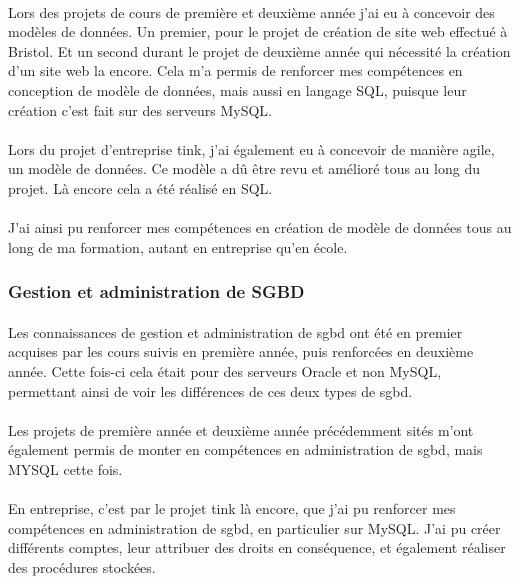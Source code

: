 \documentclass[12pt,a4paper]{report}
\begin{document}
\paragraph*{}Lors des projets de cours de première et deuxième année j'ai eu à concevoir des modèles de données. Un premier, pour le projet de création de site web effectué à Bristol. Et un second durant le projet de deuxième année qui nécessité la création d'un site web la encore. Cela m'a permis de renforcer mes compétences en conception de modèle de données, mais aussi en langage SQL, puisque leur création c'est fait sur des serveurs MySQL.
\paragraph*{}Lors du projet d'entreprise \gls{tink}, j'ai également eu à concevoir de manière agile, un modèle de données. Ce modèle a dû être revu et amélioré tous au long du projet. Là encore cela a été réalisé en SQL.
\paragraph*{}J'ai ainsi pu renforcer mes compétences en création de modèle de données tous au long de ma formation, autant en entreprise qu'en école. \\
\subsubsection{Gestion et administration de SGBD}
\paragraph*{}Les connaissances de gestion et administration de \gls{sgbd} ont été en premier acquises par les cours suivis en première année, puis renforcées en deuxième année. Cette fois-ci cela était pour des serveurs Oracle et non MySQL, permettant ainsi de voir les différences de ces deux types de \gls{sgbd}.
\paragraph*{}Les projets de première année et deuxième année précédemment sités m'ont également permis de monter en compétences en administration de \gls{sgbd}, mais MYSQL cette fois.
\paragraph*{}En entreprise, c'est par le projet \gls{tink} là encore, que j'ai pu renforcer mes compétences en administration de \gls{sgbd}, en particulier sur MySQL. J'ai pu créer différents comptes, leur attribuer des droits en conséquence, et également réaliser des procédures stockées. \\
\end{document}
